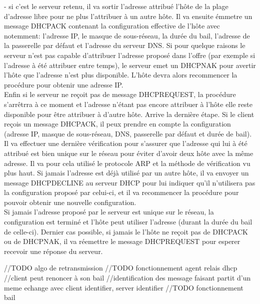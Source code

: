 \documentclass[twoside,openright,a4paper,11pt,french]{article}
\begin{document}
\item- si c'est le serveur retenu, il va sortir l'adresse attribué l'hôte de la plage d'adresse libre pour ne plus l'attribuer à un autre hôte. Il va ensuite émmetre un message DHCPACK contenant la configuration effective de l'hôte avec notemment: l'adresse IP, le masque de sous-réseau, la durée du bail, l'adresse de la passerelle par défaut et l'adresse du serveur DNS.
Si pour quelque raisons le serveur n'est pas capable d'attribuer l'adresse proposé dans l'offre (par exemple si l'adresse à été attribuer entre temps), le serveur emet un DHCPNAK pour avertir l'hôte que l'adresse n'est plus disponible. L'hôte devra alors recommencer la procédure pour obtenir une adresse IP.
\\Enfin si le serveur ne reçoit pas de message DHCPREQUEST, la procédure s'arrêtrra à ce moment et l'adresse n'étant pas encore attribuer à l'hôte elle reste disponible pour être attribuer à d'autre hôte.
Arrive la dernière étape. Si le client reçois un message DHCPACK, il peux prendre en compte la configuration (adresse IP, masque de sous-réseau, DNS, passerelle par défaut et durée de bail). Il va effectuer une dernière vérification pour s'assurer que l'adresse qui lui à été attribué est bien unique sur le réseau pour éviter d'avoir deux hôte avec la même adresse. Il va pour cela utilisé le protocole ARP et la méthode de vérification vu plus haut. Si jamais l'adresse est déjà utilisé par un autre hôte, il va envoyer un message DHCPDECLINE au serveur DHCP pour lui indiquer qu'il n'utilisera pas la configuration proposé par celui-ci, et il va recommencer la procédure pour pouvoir obtenir une nouvelle configuration.
\\Si jamais l'adresse proposé par le serveur est unique sur le réseau, la configuration est terminé et l'hôte peut utiliser l'adresse (durant la durée du bail de celle-ci).
Dernier cas possible, si jamais le l'hôte ne reçoit pas de DHCPACK ou de DHCPNAK, il va réemettre le message DHCPREQUEST pour esperer recevoir une réponse du serveur.

//TODO algo de retransmission
//TODO fonctionnement agent relais dhcp
//client peut renoncer à son bail
//identification des message faisant partit d'un meme echange avec client identifier, server identifier
//TODO fonctionnement bail
\end{document}
